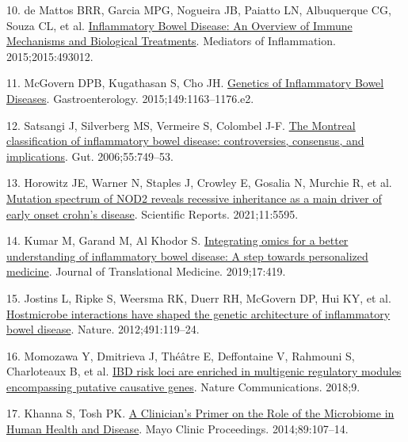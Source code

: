 \documentclass[
  12pt,
  a4paper,
  twoside,
  openright]{book}
\newlength{\cslhangindent}
\newlength{\cslentryspacingunit} %
\newenvironment{CSLReferences}[2] %
 {%
  \setlength{\parindent}{0pt}
  \ifodd #1
  \let\oldpar\par
  \def\par{\hangindent=\cslhangindent\oldpar}
  \fi
  \setlength{\parskip}{#2\cslentryspacingunit}
 }%
 {}
\begin{document}
\begin{CSLReferences}{0}{0}
\leavevmode{}%
10. de Mattos BRR, Garcia MPG, Nogueira JB, Paiatto LN, Albuquerque CG, Souza CL, et al. \href{https://doi.org/10.1155/2015/493012}{Inflammatory Bowel Disease: An Overview of Immune Mechanisms and Biological Treatments}. Mediators of Inflammation. 2015;2015:493012.

\leavevmode{}%
11. McGovern DPB, Kugathasan S, Cho JH. \href{https://doi.org/10.1053/j.gastro.2015.08.001}{Genetics of Inflammatory Bowel Diseases}. Gastroenterology. 2015;149:1163--1176.e2.

\leavevmode{}%
12. Satsangi J, Silverberg MS, Vermeire S, Colombel J-F. \href{https://doi.org/10.1136/gut.2005.082909}{The Montreal classification of inflammatory bowel disease: controversies, consensus, and implications}. Gut. 2006;55:749--53.

\leavevmode{}%
13. Horowitz JE, Warner N, Staples J, Crowley E, Gosalia N, Murchie R, et al. \href{https://doi.org/10.1038/s41598-021-84938-8}{Mutation spectrum of NOD2 reveals recessive inheritance as a main driver of early onset crohn{'}s disease}. Scientific Reports. 2021;11:5595.

\leavevmode{}%
14. Kumar M, Garand M, Al Khodor S. \href{https://doi.org/10.1186/s12967-019-02174-1}{Integrating omics for a better understanding of inflammatory bowel disease: A step towards personalized medicine}. Journal of Translational Medicine. 2019;17:419.

\leavevmode{}%
15. Jostins L, Ripke S, Weersma RK, Duerr RH, McGovern DP, Hui KY, et al. \href{https://doi.org/10.1038/nature11582}{Host{\textendash}microbe interactions have shaped the genetic architecture of inflammatory bowel disease}. Nature. 2012;491:119--24.

\leavevmode{}%
16. Momozawa Y, Dmitrieva J, Théâtre E, Deffontaine V, Rahmouni S, Charloteaux B, et al. \href{https://doi.org/10.1038/s41467-018-04365-8}{IBD risk loci are enriched in multigenic regulatory modules encompassing putative causative genes}. Nature Communications. 2018;9.

\leavevmode{}%
17. Khanna S, Tosh PK. \href{https://doi.org/10.1016/j.mayocp.2013.10.011}{A Clinician's Primer on the Role of the Microbiome in Human Health and Disease}. Mayo Clinic Proceedings. 2014;89:107--14.


\end{CSLReferences}
\end{document}
